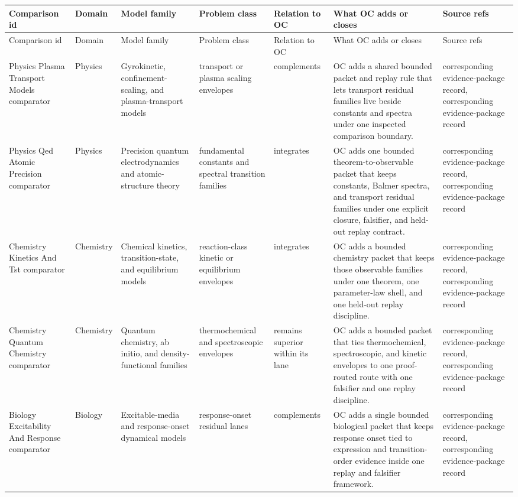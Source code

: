 \begin{longtable}{@{}L{0.14\textwidth}L{0.09\textwidth}L{0.14\textwidth}L{0.12\textwidth}L{0.10\textwidth}L{0.18\textwidth}L{0.15\textwidth}@{}}
\toprule
Comparison id & Domain & Model family & Problem class & Relation to OC & What OC adds or closes & Source refs \\
\midrule
\endfirsthead
\toprule
Comparison id & Domain & Model family & Problem class & Relation to OC & What OC adds or closes & Source refs \\
\midrule
\endhead
Physics Plasma Transport Models comparator & Physics & Gyrokinetic, confinement-scaling, and plasma-transport models & transport or plasma scaling envelopes & complements & OC adds a shared bounded packet and replay rule that lets transport residual families live beside constants and spectra under one inspected comparison boundary. & corresponding evidence-package record, corresponding evidence-package record \\
Physics Qed Atomic Precision comparator & Physics & Precision quantum electrodynamics and atomic-structure theory & fundamental constants and spectral transition families & integrates & OC adds one bounded theorem-to-observable packet that keeps constants, Balmer spectra, and transport residual families under one explicit closure, falsifier, and held-out replay contract. & corresponding evidence-package record, corresponding evidence-package record \\
Chemistry Kinetics And Tst comparator & Chemistry & Chemical kinetics, transition-state, and equilibrium models & reaction-class kinetic or equilibrium envelopes & integrates & OC adds a bounded chemistry packet that keeps those observable families under one theorem, one parameter-law shell, and one held-out replay discipline. & corresponding evidence-package record, corresponding evidence-package record \\
Chemistry Quantum Chemistry comparator & Chemistry & Quantum chemistry, ab initio, and density-functional families & thermochemical and spectroscopic envelopes & remains superior within its lane & OC adds a bounded packet that ties thermochemical, spectroscopic, and kinetic envelopes to one proof-routed route with one falsifier and one replay discipline. & corresponding evidence-package record, corresponding evidence-package record \\
Biology Excitability And Response comparator & Biology & Excitable-media and response-onset dynamical models & response-onset residual lanes & complements & OC adds a single bounded biological packet that keeps response onset tied to expression and transition-order evidence inside one replay and falsifier framework. & corresponding evidence-package record, corresponding evidence-package record \\

\end{longtable}
